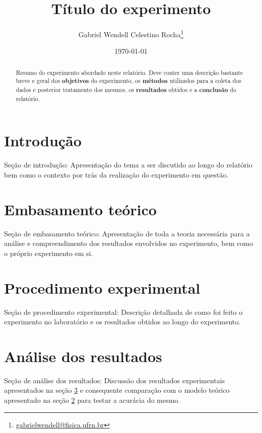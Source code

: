 \documentclass[letterpaper, 12pt]{article}
\begin{document}
\title{\bf Título do experimento}
\author{Gabriel Wendell Celestino Rocha\footnote{\href{mailto:gabrielwendell@fisica.ufrn.br}{gabrielwendell@fisica.ufrn.br}}}
\date{\today}
\maketitle

\begin{abstract}
Resumo do experimento abordado neste relatório. Deve conter uma descrição bastante breve e geral dos \textbf{objetivos} do experimento, os \textbf{métodos} utilizados para a coleta dos dados e posterior tratamento dos mesmos, os \textbf{resultados} obtidos e a \textbf{conclusão} do relatório.
\end{abstract}



\section{Introdução}\label{Sec 1 - Introdução}
Seção de introdução: Apresentação do tema a ser discutido ao longo do relatório bem como o contexto por trás da realização do experimento em questão.



\section{Embasamento teórico}\label{Sec 2 - Teoria}
Seção de embasamento teórico: Apresentação de toda a teoria necessária para a análise e compreendimento dos resultados envolvidos no experimento, bem como o próprio experimento em si.



\section{Procedimento experimental}\label{Sec 3 - Experimento}
Seção de procedimento experimental: Descrição detalhada de como foi feito o experimento no laboratório e os resultados obtidos ao longo do experimento.



\section{Análise dos resultados}\label{Sec 4 - Resultados}
Seção de análise dos resultados: Discussão dos resultados experimentais apresentados na seção \ref{Sec 3 - Experimento} e consequente comparação com o modelo teórico apresentado na seção \ref{Sec 2 - Teoria} para testar a acurácia do mesmo.
\end{document}
